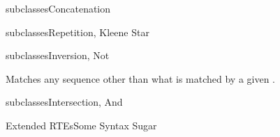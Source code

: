 \begin{frame}{ subclasses}{Concatenation}
  \usebox\catbox
 \end{frame}



\newsavebox\starbox
\begin{lrbox}{\starbox}
  \begin{minipage}{12cm}
    
  \end{minipage}
\end{lrbox}

\newsavebox\notbox
\begin{lrbox}{\notbox}
  \begin{minipage}{12cm}
    
  \end{minipage}
\end{lrbox}


\begin{frame}{ subclasses}{Repetition, Kleene Star}
  \usebox\starbox
\end{frame}

\begin{frame}{ subclasses}{Inversion, Not}
  \usebox\notbox

  \bigskip

  Matches any sequence other than what is matched by a given .
\end{frame}

\begin{frame}{ subclasses}{Intersection, And}
  \usebox\andbox
 \end{frame}


\newsavebox\extendedbox
\begin{lrbox}{\extendedbox}
  \begin{minipage}{12cm}
  
  \end{minipage}
\end{lrbox}

\begin{frame}{Extended RTEs}{Some Syntax Sugar}
  \usebox\extendedbox
\end{frame}





